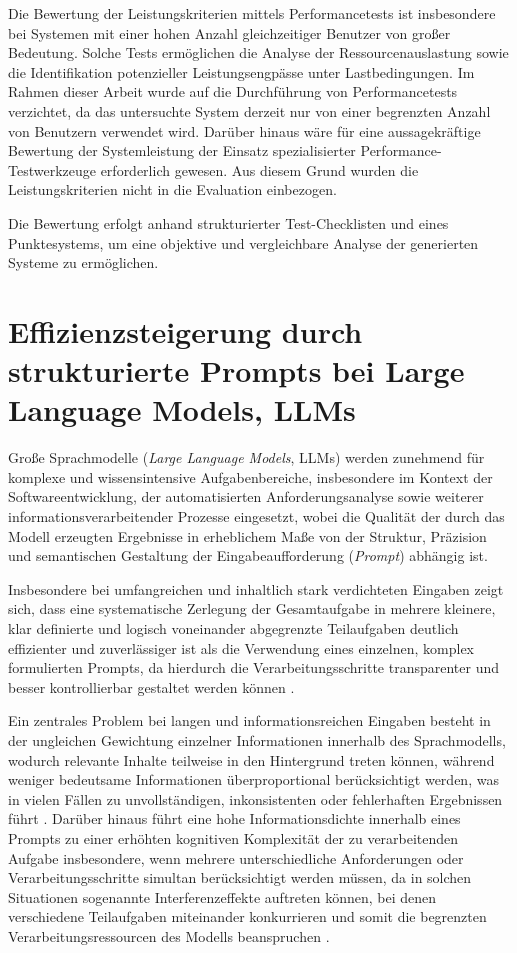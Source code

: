 Die Bewertung der Leistungskriterien mittels Performancetests ist insbesondere bei Systemen mit einer hohen Anzahl gleichzeitiger Benutzer von großer Bedeutung. Solche Tests ermöglichen die Analyse der Ressourcenauslastung sowie die Identifikation potenzieller Leistungsengpässe unter Lastbedingungen. Im Rahmen dieser Arbeit wurde auf die Durchführung von Performancetests verzichtet, da das untersuchte System derzeit nur von einer begrenzten Anzahl von Benutzern verwendet wird. Darüber hinaus wäre für eine aussagekräftige Bewertung der Systemleistung der Einsatz spezialisierter Performance-Testwerkzeuge erforderlich gewesen. Aus diesem Grund wurden die Leistungskriterien nicht in die Evaluation einbezogen.

Die Bewertung erfolgt anhand strukturierter Test-Checklisten und eines Punktesystems, um eine objektive und vergleichbare Analyse der generierten Systeme zu ermöglichen.

\section{Effizienzsteigerung durch strukturierte Prompts bei Large Language Models, LLMs}
Große Sprachmodelle (\textit{Large Language Models}, LLMs) werden zunehmend für komplexe und wissensintensive Aufgabenbereiche, insbesondere im Kontext der Softwareentwicklung, der automatisierten Anforderungsanalyse sowie weiterer informationsverarbeitender Prozesse eingesetzt, wobei die Qualität der durch das Modell erzeugten Ergebnisse in erheblichem Maße von der Struktur, Präzision und semantischen Gestaltung der Eingabeaufforderung (\textit{Prompt}) abhängig ist.

Insbesondere bei umfangreichen und inhaltlich stark verdichteten Eingaben zeigt sich, dass eine systematische Zerlegung der Gesamtaufgabe in mehrere kleinere, klar definierte und logisch voneinander abgegrenzte Teilaufgaben deutlich effizienter und zuverlässiger ist als die Verwendung eines einzelnen, komplex formulierten Prompts, da hierdurch die Verarbeitungsschritte transparenter und besser kontrollierbar gestaltet werden können \cite{cot10_1145_3690635} .

Ein zentrales Problem bei langen und informationsreichen Eingaben besteht in der ungleichen Gewichtung einzelner Informationen innerhalb des Sprachmodells, wodurch relevante Inhalte teilweise in den Hintergrund treten können, während weniger bedeutsame Informationen überproportional berücksichtigt werden, was in vielen Fällen zu unvollständigen, inkonsistenten oder fehlerhaften Ergebnissen führt \cite{liu2023lost}.
Darüber hinaus führt eine hohe Informationsdichte innerhalb eines Prompts zu einer erhöhten kognitiven Komplexität der zu verarbeitenden Aufgabe insbesondere, wenn mehrere unterschiedliche Anforderungen oder Verarbeitungsschritte simultan berücksichtigt werden müssen, da in solchen Situationen sogenannte Interferenzeffekte auftreten können, bei denen verschiedene Teilaufgaben miteinander konkurrieren und somit die begrenzten Verarbeitungsressourcen des Modells beanspruchen \cite{cot10_1145_3690635}.

